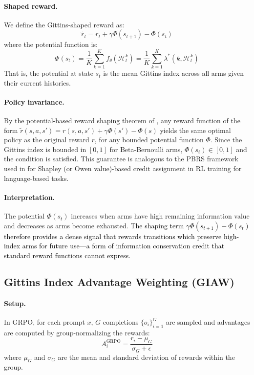 \documentclass[11pt]{article}
\newcommand{\an}[1]{\textcolor{black}{#1}}
\theoremstyle{plain}
\theoremstyle{definition}
\theoremstyle{remark}
\begin{document}
\paragraph{Shaped reward.} We define the Gittins-shaped reward as:
\begin{equation}
    \tilde{r}_t = r_t + \gamma \Phi(s_{t+1}) - \Phi(s_t)
\end{equation}
where the potential function is:
\begin{equation}
    \Phi(s_t) = \frac{1}{K} \sum_{k=1}^K f_\theta(\mathcal{H}_t^k)
    = \frac{1}{K} \sum_{k=1}^K \lambda^*(k, \mathcal{H}_t^k)
\end{equation}
That is, the potential at state $s_t$ is the mean Gittins index across all 
arms given their current histories.

\paragraph{Policy invariance.} By the potential-based reward shaping 
theorem of \citet{ng1999policy}, any reward function of the form 
$\tilde{r}(s, a, s') = r(s, a, s') + \gamma\Phi(s') - \Phi(s)$ yields 
the same optimal policy as the original reward $r$, for any bounded 
potential function $\Phi$. Since the Gittins index is bounded in $[0, 1]$ 
for Beta-Bernoulli arms, $\Phi(s_t) \in [0, 1]$ and the condition is 
satisfied. This guarantee is analogous to the PBRS framework used in 
\citet{cao2025scar, nath2026owen} for Shapley (or Owen value)-based credit assignment in RL training for language-based tasks. 

\paragraph{Interpretation.} The potential $\Phi(s_t)$ increases when 
arms have high remaining information value and decreases as arms become 
exhausted. \an{The shaping term $\gamma\Phi(s_{t+1}) - \Phi(s_t)$ therefore 
provides a dense signal that rewards transitions which preserve high-index 
arms for future use—a form of information conservation credit that 
standard reward functions cannot express.}

\subsection{Gittins Index Advantage Weighting (GIAW)}

\paragraph{Setup.} In GRPO, for each prompt $x$, $G$ completions 
$\{o_i\}_{i=1}^G$ are sampled and advantages are computed by 
group-normalizing the rewards:
\begin{equation}
    A_i^{\text{GRPO}} = \frac{r_i - \mu_G}{\sigma_G + \epsilon}
\end{equation}
where $\mu_G$ and $\sigma_G$ are the mean and standard deviation of rewards 
within the group.
\end{document}
